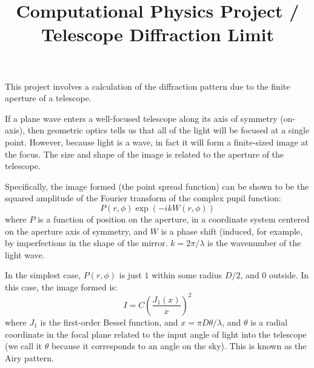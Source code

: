 \documentclass[11pt, preprint]{aastex}
\begin{document}
\title{\bf Computational Physics Project / Telescope Diffraction Limit}

This project involves a calculation of the diffraction pattern due to
the finite aperture of a telescope.

If a plane wave enters a well-focused telescope along its axis of
symmetry (on-axis), then geometric optics tells us that all of the
light will be focused at a single point. However, because light is a
wave, in fact it will form a finite-sized image at the focus. The size
and shape of the image is related to the aperture of the telescope.

Specifically, the image formed (the point spread function) can be
shown to be the squared amplitude of the Fourier transform of the
complex pupil function:
\begin{equation}
P(r, \phi) \exp\left(-ik W(r,\phi)\right)
\end{equation}
where $P$ is a function of position on the aperture, in a coordinate
system centered on the aperture axis of symmetry, and $W$ is a phase
shift (induced, for example, by imperfections in the shape of the
mirror. $k= 2\pi/\lambda$ is the wavenumber of the light wave.

In the simplest case, $P(r, \phi)$ is just $1$ within some radius
$D/2$, and $0$ outside.  In this case, the image formed is:
\begin{equation}
I = C\left(\frac{J_1(x)}{x}\right)^2
\end{equation}
where $J_1$ is the first-order Bessel function, and $x=\pi
D\theta/\lambda$, and $\theta$ is a radial coordinate in the focal
plane related to the input angle of light into the telescope (we call
it $\theta$ because it corresponds to an angle on the sky). This is
known as the Airy pattern.
\end{document}
